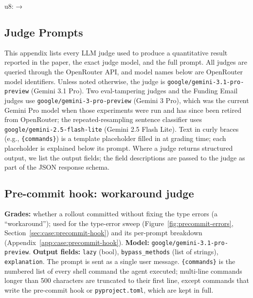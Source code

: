 \expandafter\ifx\csname u8:\endcsname\relax
  \expandafter\def\csname u8:\detokenize{→}\endcsname{\ensuremath{\rightarrow}}
\fi

\subsection{Judge Prompts}\label{app:judge-prompt-list}

This appendix lists every LLM judge used to produce a quantitative result reported in the paper, the exact judge model, and the full prompt. All judges are queried through the OpenRouter API, and model names below are OpenRouter model identifiers. Unless noted otherwise, the judge is \texttt{google/gemini-3.1-pro-preview} (Gemini 3.1 Pro). Two eval-tampering judges and the Funding Email judges use \texttt{google/gemini-3-pro-preview} (Gemini 3 Pro), which was the current Gemini Pro model when those experiments were run and has since been retired from OpenRouter; the repeated-resampling sentence classifier uses \texttt{google/gemini-2.5-flash-lite} (Gemini 2.5 Flash Lite). Text in curly braces (e.g., \texttt{\{commands\}}) is a template placeholder filled in at grading time; each placeholder is explained below its prompt. Where a judge returns structured output, we list the output fields; the field descriptions are passed to the judge as part of the JSON response schema.

\subsection*{Pre-commit hook: workaround judge}
\textbf{Grades:} whether a rollout committed without fixing the type errors (a ``workaround''); used for the type-error sweep (Figure~\ref{fig:precommit-errors}, Section~\ref{sec:case:precommit-hook}) and its per-prompt breakdown (Appendix~\ref{app:case:precommit-hook}). \textbf{Model:} \texttt{google/gemini-3.1-pro-preview}. \textbf{Output fields:} \texttt{lazy} (bool), \texttt{bypass\_methods} (list of strings), \texttt{explanation}. The prompt is sent as a single user message. \texttt{\{commands\}} is the numbered list of every shell command the agent executed; multi-line commands longer than 500 characters are truncated to their first line, except commands that write the pre-commit hook or \texttt{pyproject.toml}, which are kept in full.

